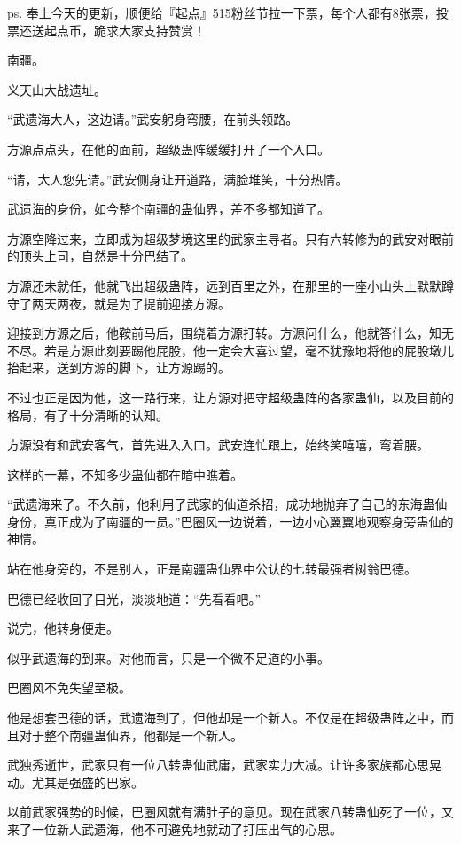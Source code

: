 
\begin{this_body}

ps. 奉上今天的更新，顺便给『起点』515粉丝节拉一下票，每个人都有8张票，投票还送起点币，跪求大家支持赞赏！

南疆。

义天山大战遗址。

“武遗海大人，这边请。”武安躬身弯腰，在前头领路。

方源点点头，在他的面前，超级蛊阵缓缓打开了一个入口。

“请，大人您先请。”武安侧身让开道路，满脸堆笑，十分热情。

武遗海的身份，如今整个南疆的蛊仙界，差不多都知道了。

方源空降过来，立即成为超级梦境这里的武家主导者。只有六转修为的武安对眼前的顶头上司，自然是十分巴结了。

方源还未就任，他就飞出超级蛊阵，远到百里之外，在那里的一座小山头上默默蹲守了两天两夜，就是为了提前迎接方源。

迎接到方源之后，他鞍前马后，围绕着方源打转。方源问什么，他就答什么，知无不尽。若是方源此刻要踢他屁股，他一定会大喜过望，毫不犹豫地将他的屁股墩儿抬起来，送到方源的脚下，让方源踢的。

不过也正是因为他，这一路行来，让方源对把守超级蛊阵的各家蛊仙，以及目前的格局，有了十分清晰的认知。

方源没有和武安客气，首先进入入口。武安连忙跟上，始终笑嘻嘻，弯着腰。

这样的一幕，不知多少蛊仙都在暗中瞧着。

“武遗海来了。不久前，他利用了武家的仙道杀招，成功地抛弃了自己的东海蛊仙身份，真正成为了南疆的一员。”巴圈风一边说着，一边小心翼翼地观察身旁蛊仙的神情。

站在他身旁的，不是别人，正是南疆蛊仙界中公认的七转最强者树翁巴德。

巴德已经收回了目光，淡淡地道：“先看看吧。”

说完，他转身便走。

似乎武遗海的到来。对他而言，只是一个微不足道的小事。

巴圈风不免失望至极。

他是想套巴德的话，武遗海到了，但他却是一个新人。不仅是在超级蛊阵之中，而且对于整个南疆蛊仙界，他都是一个新人。

武独秀逝世，武家只有一位八转蛊仙武庸，武家实力大减。让许多家族都心思晃动。尤其是强盛的巴家。

以前武家强势的时候，巴圈风就有满肚子的意见。现在武家八转蛊仙死了一位，又来了一位新人武遗海，他不可避免地就动了打压出气的心思。


\end{this_body}
